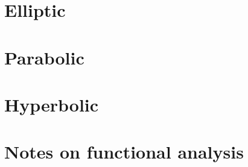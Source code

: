 \documentclass[oneside,a4paper,11pt]{report}
\begin{document}
\chapter{Elliptic}

\chapter{Parabolic}

\chapter{Hyperbolic}

\appendix

\chapter{Notes on functional analysis}

\end{document}
